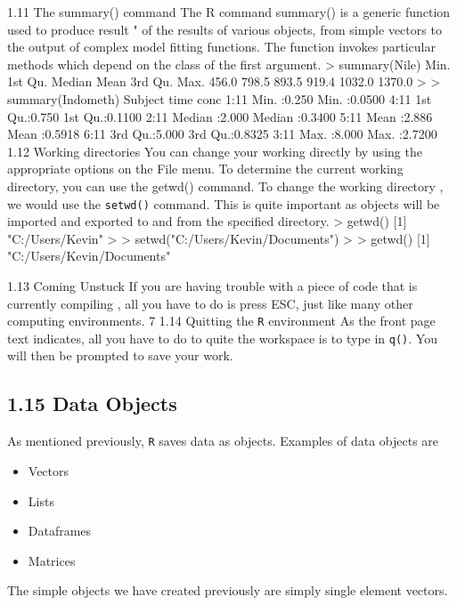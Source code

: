 1.11 The summary() command
The R command summary() is a generic function used to produce result \summaries" of the
results of various objects, from simple vectors to the output of complex model fitting functions.
The function invokes particular methods which depend on the class of the first argument.
> summary(Nile)
Min. 1st Qu. Median Mean 3rd Qu. Max.
456.0 798.5 893.5 919.4 1032.0 1370.0
>
> summary(Indometh)
Subject time conc
1:11 Min. :0.250 Min. :0.0500
4:11 1st Qu.:0.750 1st Qu.:0.1100
2:11 Median :2.000 Median :0.3400
5:11 Mean :2.886 Mean :0.5918
6:11 3rd Qu.:5.000 3rd Qu.:0.8325
3:11 Max. :8.000 Max. :2.7200
1.12 Working directories
You can change your working directly by using the appropriate options on the File menu. To
determine the current working directory, you can use the getwd() command. To change the
working directory , we would use the \texttt{setwd()} command. This is quite important as objects
will be imported and exported to and from the specified directory.
> getwd()
[1] "C:/Users/Kevin"
>
> setwd("C:/Users/Kevin/Documents")
>
> getwd()
[1] "C:/Users/Kevin/Documents"

1.13 Coming Unstuck
If you are having trouble with a piece of code that is currently compiling , all you have to do
is press ESC, just like many other computing environments.
7
1.14 Quitting the \texttt{R} environment
As the front page text indicates, all you have to do to quite the workspace is to type in \texttt{q()}.
You will then be prompted to save your work.

\subsection{1.15 Data Objects}
As mentioned previously, \texttt{R} saves data as objects. Examples of data objects are
\begin{itemize}
\item Vectors
\item Lists
\item Dataframes
\item Matrices
\end{itemize}
The simple objects we have created previously are simply single element vectors.


